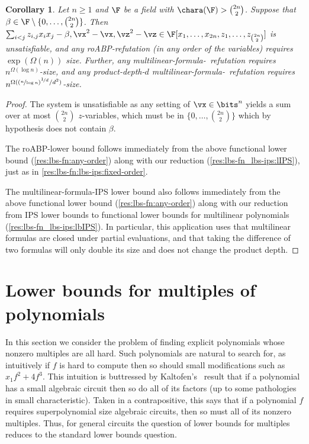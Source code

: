 \documentclass[11pt]{article}
\numberwithin{equation}{section}
\newtheorem{corollary}[theorem]{Corollary}
\theoremstyle{definition}
\theoremstyle{plain}
\begin{document}
\begin{corollary}\label{res:lbs-fn:lbs-ips:vary-order}
  Let $n\ge 1$ and $\F$ be a field with $\chara(\F)>\binom{2n}{2}$.  Suppose that $\beta\in\F\setminus\{0,\ldots,\binom{2n}{2}\}$.  Then $\sum_{i<j} z_{i,j}x_ix_j-\beta,\vx^2-\vx,\vz^2-\vz\in\F[x_1,\ldots,x_{2n},z_1,\ldots,z_{\binom{2n}{2}}]$ is unsatisfiable, and any roABP-\lIPS refutation (in any order of the variables) requires
%
 $\exp(\Omega(n))$ size.   %
Further, any multilinear-formula-\IPS\ refutation requires $n^{\Omega(\log n)}$-size, and any product-depth-$d$ multilinear-formula-\IPS\ refutation requires $n^{\Omega((\nicefrac{n}{\log n})^{\nicefrac{1}{d}}/d^2)}$-size.
\end{corollary}
\begin{proof}
        The system is unsatisfiable as any setting of $\vx\in\bits^n$ yields a sum over at most $\binom{2n}{2}$ $z$-variables, which must be in $\{0,\ldots,\binom{2n}{2}\}$ which by hypothesis does not contain $\beta$.

        The roABP-\lIPS lower bound follows immediately from the above functional lower bound (\autoref{res:lbs-fn:any-order}) along with our reduction (\autoref{res:lbs-fn_lbs-ips:lIPS}), just as in \autoref{res:lbs-fn:lbs-ips:fixed-order}.

        The multilinear-formula-IPS lower bound also follows immediately from the above functional lower bound (\autoref{res:lbs-fn:any-order}) along with our reduction from IPS lower bounds to functional lower bounds for multilinear polynomials (\autoref{res:lbs-fn_lbs-ips:lbIPS}).  In particular, this application uses that multilinear formulas are closed under partial evaluations, and that taking the difference of two formulas will only double its size and does not change the product depth.
\end{proof}


\section{Lower bounds for multiples of polynomials}\label{sec:lbs-mult}

In this section we consider the problem of finding explicit polynomials whose nonzero multiples are all hard. Such polynomials are natural to search for, as intuitively if $f$ is hard to compute then so should small modifications such as $x_1f^2+4f^3$. This intuition is buttressed by Kaltofen's~\cite{Kaltofen89} result that if a polynomial has a small algebraic circuit then so do all of its factors (up to some pathologies in small characteristic). Taken in a contrapositive, this says that if a polynomial $f$ requires superpolynomial size algebraic circuits, then so must all of its nonzero multiples.  Thus, for general circuits the question of lower bounds for multiples reduces to the standard lower bounds question. %
\end{document}
